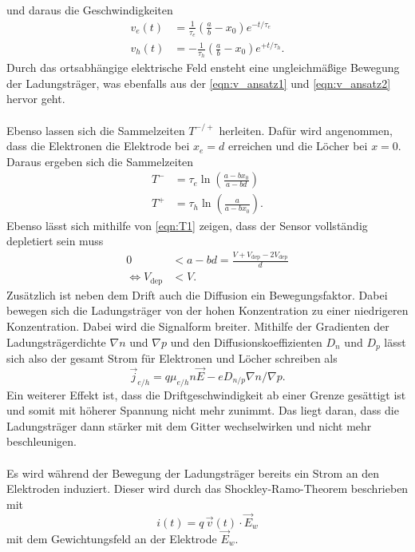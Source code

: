 und daraus die Geschwindigkeiten
\begin{align}
    v_e\left(t\right) &= \frac{1}{\tau_e} \left(\frac{a}{b}-x_0\right)e^{-t/\tau_e}    \label{eqn:v_ansatz1} \\
    v_h\left(t\right) &= -\frac{1}{\tau_h}\left(\frac{a}{b}-x_0\right)e^{+t/\tau_h}.
    \label{eqn:v_ansatz2}
\end{align}
Durch das ortsabhängige elektrische Feld ensteht eine ungleichmäßige Bewegung der Ladungsträger, was ebenfalls aus der \autoref{eqn:v_ansatz1} und \autoref{eqn:v_ansatz2} hervor geht.\\\\
Ebenso lassen sich die Sammelzeiten $T^{-/+}$ herleiten. Dafür wird angenommen, dass die Elektronen die Elektrode bei $x_e = d$ erreichen und die Löcher bei $x= 0$. Daraus ergeben sich die Sammelzeiten
\begin{align}
    T^{-} &= \tau_e\ln{\left(\frac{a-bx_0}{a-bd}\right)}    \label{eqn:T1} \\
    T^{+} &= \tau_h \ln{\left(\frac{a}{a-bx_0}\right)}.
    \label{eqn:T2}
\end{align}
Ebenso lässt sich mithilfe von \autoref{eqn:T1} zeigen, dass der Sensor vollständig depletiert sein muss
\begin{align*}
    0 &< a-bd = \frac{V+V_{\text{dep}}-2V_{\text{dep}}}{d}\\
    \Leftrightarrow V_{\text{dep}} &< V.
\end{align*}
Zusätzlich ist neben dem Drift auch die Diffusion ein Bewegungsfaktor. Dabei bewegen sich die Ladungsträger von der hohen Konzentration zu einer niedrigeren Konzentration. Dabei wird die Signalform breiter. Mithilfe der Gradienten der Ladungsträgerdichte $\nabla n$ und $\nabla p$ und den Diffusionskoeffizienten $D_n$ und $D_p$ lässt sich also der gesamt Strom für Elektronen und Löcher schreiben als
\begin{equation*}
    \vec{j}_{e/h} = q \mu_{e/h} n \vec{E}- e D_{n/p} \nabla n/\nabla p.
\end{equation*}
Ein weiterer Effekt ist, dass die Driftgeschwindigkeit ab einer Grenze gesättigt ist und somit mit höherer Spannung nicht mehr zunimmt. Das liegt daran, dass die Ladungsträger dann stärker mit dem Gitter wechselwirken und nicht mehr beschleunigen.\\\\
Es wird während der Bewegung der Ladungsträger bereits ein Strom an den Elektroden induziert. Dieser wird durch das Shockley-Ramo-Theorem beschrieben mit
\begin{equation*}
    i(t) = q\,\vec{v}(t)\cdot \vec{E}_w
\end{equation*}
mit dem Gewichtungsfeld an der Elektrode $\vec{E}_w$. 
